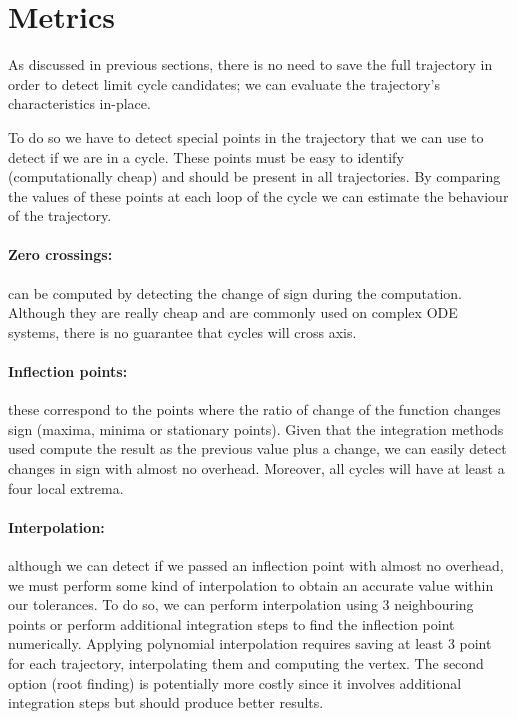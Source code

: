 
\section{Metrics}%
\label{sec:metrics}

As discussed in previous sections, there is no need to save the full trajectory
in order to detect limit cycle candidates; we can evaluate the trajectory's
characteristics in-place.

To do so we have to detect special points in the trajectory that we can use to
detect if we are in a cycle. These points must be easy to identify
(computationally cheap) and should be present in all trajectories. By comparing
the values of these points at each loop of the cycle we can estimate the
behaviour of the trajectory.

\paragraph{Zero crossings:} can be computed by detecting the change of sign
during the computation. Although they are really cheap and are commonly used on
complex ODE systems, there is no guarantee that cycles will cross axis.

\paragraph{Inflection points:} these correspond to the points where the ratio of
change of the function changes sign (maxima, minima or stationary points). Given
that the integration methods used compute the result as the previous value plus
a change, we can easily detect changes in sign with almost no overhead.
Moreover, all cycles will have at least a four local extrema.

\paragraph{Interpolation:} although we can detect if we passed an inflection
point with almost no overhead, we must perform some kind of interpolation to
obtain an accurate value within our tolerances. To do so, we can perform
interpolation using 3 neighbouring points or perform additional integration steps
to find the inflection point numerically. Applying polynomial interpolation
requires saving at least 3 point for each trajectory, interpolating them and
computing the vertex. The second option (root finding) is potentially more
costly since it involves additional integration steps but should produce better
results.

